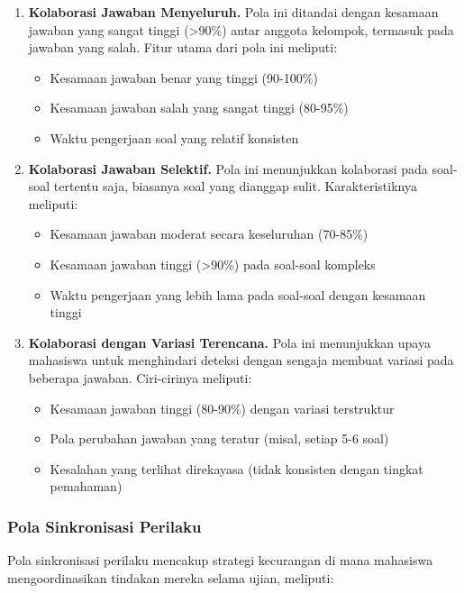 \begin{enumerate}
    \item \textbf{Kolaborasi Jawaban Menyeluruh.} Pola ini ditandai dengan kesamaan jawaban yang sangat tinggi (>90\%) antar anggota kelompok, termasuk pada jawaban yang salah. Fitur utama dari pola ini meliputi:
    \begin{itemize}
        \item Kesamaan jawaban benar yang tinggi (90-100\%)
        \item Kesamaan jawaban salah yang sangat tinggi (80-95\%)
        \item Waktu pengerjaan soal yang relatif konsisten
    \end{itemize}

    \item \textbf{Kolaborasi Jawaban Selektif.} Pola ini menunjukkan kolaborasi pada soal-soal tertentu saja, biasanya soal yang dianggap sulit. Karakteristiknya meliputi:
    \begin{itemize}
        \item Kesamaan jawaban moderat secara keseluruhan (70-85\%)
        \item Kesamaan jawaban tinggi (>90\%) pada soal-soal kompleks
        \item Waktu pengerjaan yang lebih lama pada soal-soal dengan kesamaan tinggi
    \end{itemize}

    \item \textbf{Kolaborasi dengan Variasi Terencana.} Pola ini menunjukkan upaya mahasiswa untuk menghindari deteksi dengan sengaja membuat variasi pada beberapa jawaban. Ciri-cirinya meliputi:
    \begin{itemize}
        \item Kesamaan jawaban tinggi (80-90\%) dengan variasi terstruktur
        \item Pola perubahan jawaban yang teratur (misal, setiap 5-6 soal)
        \item Kesalahan yang terlihat direkayasa (tidak konsisten dengan tingkat pemahaman)
    \end{itemize}
\end{enumerate}

\subsubsection{Pola Sinkronisasi Perilaku}

Pola sinkronisasi perilaku mencakup strategi kecurangan di mana mahasiswa mengoordinasikan tindakan mereka selama ujian, meliputi:

